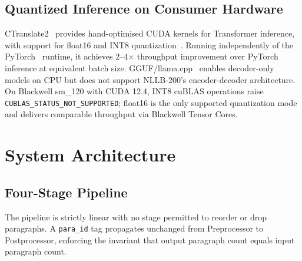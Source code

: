 \documentclass[journal]{IEEEtran}
\begin{document}
\subsection{Quantized Inference on Consumer Hardware}

CTranslate2~\cite{ctranslate2_klein} provides hand-optimised CUDA kernels for
Transformer inference, with support for float16 and INT8 quantization~\cite{dettmers2022llmint8}.
Running independently of the PyTorch~\cite{pytorch2024} runtime, it achieves
2--4$\times$ throughput improvement over PyTorch inference at equivalent batch size.
GGUF/llama.cpp~\cite{llamacpp} enables decoder-only models on CPU but does not
support NLLB-200's encoder-decoder architecture.
On Blackwell sm\_120 with CUDA 12.4, INT8 cuBLAS operations raise
\texttt{CUBLAS\_STATUS\_NOT\_SUPPORTED}; float16 is the only supported quantization
mode and delivers comparable throughput via Blackwell Tensor Cores.

\section{System Architecture}
\label{sec:system}

\subsection{Four-Stage Pipeline}

The pipeline is strictly linear with no stage permitted to reorder or drop
paragraphs.
A \texttt{para\_id} tag propagates unchanged from Preprocessor to Postprocessor,
enforcing the invariant that output paragraph count equals input paragraph count.
\end{document}
